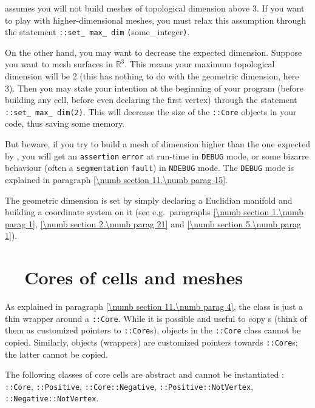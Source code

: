 \leavevmode {\ManiFEM} assumes you will not build meshes of topological dimension
above 3.
If you want to play with higher-dimensional meshes, you must relax this assumption
through the statement {\small\tt{}::set\_\,max\_\,dim}
{\small\tt (}some\_\,integer{\small\tt )}.

On the other hand, you may want to decrease the expected dimension.
Suppose you want to mesh surfaces in $ \mathbb{R}^3 $.
This means your maximum topological dimension will be 2
(this has nothing to do with the geometric dimension, here 3).
Then you may state your intention at the beginning of your program
(before building any cell, before even declaring the first vertex) through
the statement {\small\tt{}::set\_\,max\_\,dim(2)}.
This will decrease the size of the {\small\tt{}::Core} objects in your code,
thus saving some memory.

But beware, if you try to build a mesh of dimension higher than the one expected by
\maniFEM, you will get an {\small\tt assertion} {\small\tt error} at run-time in
{\small\tt DEBUG} mode, or some bizarre behaviour (often a {\small\tt segmentation}
{\small\tt fault}) in {\small\tt NDEBUG} mode.
The {\small\tt DEBUG} mode is explained in paragraph \ref{\numb section 11.\numb parag 15}.

The geometric dimension is set by simply declaring a Euclidian manifold and building
a coordinate system on it (see e.g.\ paragraphs \ref{\numb section 1.\numb parag 1},
\ref{\numb section 2.\numb parag 21} and \ref{\numb section 5.\numb parag 1}).


\section{~~Cores of cells and meshes}\label{\numb section 11.\numb parag 8}

As explained in paragraph \ref{\numb section 11.\numb parag 4}, the {\small\tt{}}
class is just a thin wrapper around a {\small\tt{}::Core}.
While it is possible and useful to copy {\small\tt{}}s (think of them as customized
pointers to {\small\tt{}::Core}s), objects in the {\small\tt{}::Core}
class cannot be copied.
Similarly, {\small\tt{}} objects (wrappers) are customized pointers towards
{\small\tt{}::Core}s; the latter cannot be copied.

The following classes of core cells are abstract and cannot be instantiated :
{\small\tt{}::Core}, {\small\tt{}::Positive},
{\small\tt{}::Core::Negative}, {\small\tt{}::Positive::NotVertex},
{\small\tt{}::Negative::NotVertex}.

